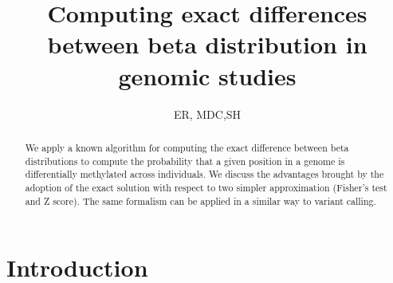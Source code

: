 \documentclass{amsart}
\title{Computing exact differences between beta distribution in genomic studies}
\author{ER, MDC,SH}
\begin{document}
\begin{abstract}
We apply a known algorithm for computing the exact difference between beta distributions
to compute the probability that a given position in a genome is differentially methylated across
individuals. We discuss the advantages brought by the adoption of the exact solution
with respect to two simpler approximation (Fisher's test and Z score).
The same formalism can be applied in a similar way to variant calling.
\end{abstract}
\maketitle

\section{Introduction}
\end{document}
